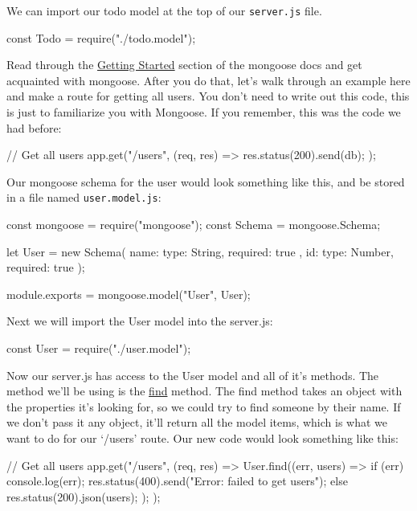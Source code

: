 \documentclass{42-en}
\begin{document}
    We can import our todo model at the top of our \texttt{server.js} file.
    \begin{42jscode}
        const Todo = require("./todo.model");
    \end{42jscode}
    
    \newpage
    
    Read through the \href{https://mongoosejs.com/docs/index.html}{Getting Started} section of the mongoose docs and get acquainted with mongoose.
After you do that, let’s walk through an example here and make a route for getting all users. You don’t need to write out this code, this is just to familiarize you with Mongoose.
If you remember, this was the code we had before:
    
\begin{42jscode}
        // Get all users
        app.get("/users", (req, res) => {
            res.status(200).send(db);
        });
\end{42jscode}

    Our mongoose schema for the user would look something like this, and be stored in a file named \texttt{user.model.js}:

	\begin{42jscode}
        const mongoose = require("mongoose");
        const Schema = mongoose.Schema;

        let User = new Schema({
            name: { type: String, required: true },
            id: { type: Number, required: true }
        });

        module.exports = mongoose.model("User", User);
    \end{42jscode}

    Next we will import the User model into the server.js:

    \begin{42jscode}
        const User = require("./user.model");
    \end{42jscode}

    Now our server.js has access to the User model and all of it’s methods. The method we’ll be using is the \href{https://mongoosejs.com/docs/api.html#model_Model.find}{find} method. The find method takes an object with the properties it’s looking for, so we could try to find someone by their name. If we don’t pass it any object, it’ll return all the model items, which is what we want to do for our ‘/users’ route. Our new code would look something like this:

\begin{42jscode}
        // Get all users
        app.get("/users", (req, res) => {
            User.find((err, users) => {
                if (err) {
                console.log(err);
                res.status(400).send("Error: failed to get users");
                } else {
                res.status(200).json(users);
                }
            });
        });
\end{42jscode}
\end{document}
